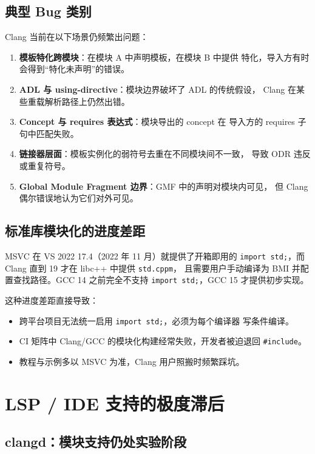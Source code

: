 \documentclass[12pt,a4paper,fontset=fandol]{ctexbook}
\newcommand{\flag}[1]{\texttt{#1}}
\begin{document}
\section{典型 Bug 类别}

Clang 当前在以下场景仍频繁出问题：

\begin{enumerate}
  \item \textbf{模板特化跨模块}：在模块 A 中声明模板，在模块 B 中提供
        特化，导入方有时会得到“特化未声明”的错误。
  \item \textbf{ADL 与 using-directive}：模块边界破坏了 ADL 的传统假设，
        Clang 在某些重载解析路径上仍然出错。
  \item \textbf{Concept 与 requires 表达式}：模块导出的 concept 在
        导入方的 requires 子句中匹配失败。
  \item \textbf{链接器层面}：模板实例化的弱符号去重在不同模块间不一致，
        导致 ODR 违反或重复符号。
  \item \textbf{Global Module Fragment 边界}：GMF 中的声明对模块内可见，
        但 Clang 偶尔错误地认为它们对外可见。
\end{enumerate}

\section{标准库模块化的进度差距}

MSVC 在 VS 2022 17.4（2022 年 11 月）就提供了开箱即用的
\flag{import std;}，而 Clang 直到 19 才在 libc++ 中提供 \texttt{std.cppm}，
且需要用户手动编译为 BMI 并配置查找路径。GCC 14 之前完全不支持
\flag{import std;}，GCC 15 才提供初步实现。

这种进度差距直接导致：

\begin{itemize}
  \item 跨平台项目无法统一启用 \flag{import std;}，必须为每个编译器
        写条件编译。
  \item CI 矩阵中 Clang/GCC 的模块化构建经常失败，开发者被迫退回
        \flag{\#include}。
  \item 教程与示例多以 MSVC 为准，Clang 用户照搬时频繁踩坑。
\end{itemize}

\chapter{LSP / IDE 支持的极度滞后}

\section{clangd：模块支持仍处实验阶段}
\end{document}

